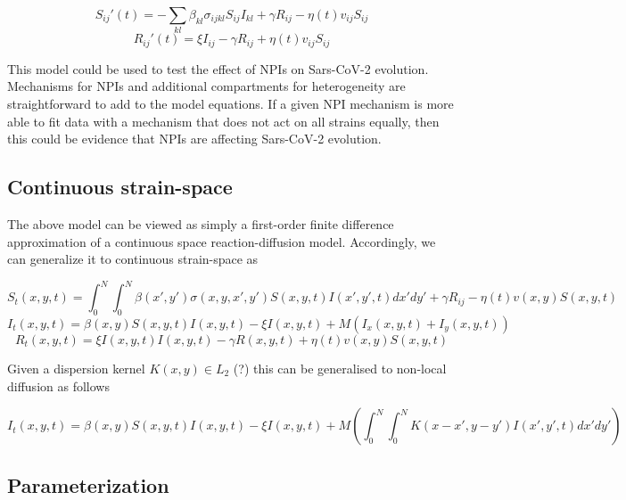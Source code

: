 \documentclass{article}
\begin{document}
\begin{equation}
    S_{ij}'(t) = -\sum_{kl} \beta_{kl} \sigma_{ijkl} S_{ij} I_{kl} + \gamma R_{ij} -  \eta(t) v_{ij} S_{ij} \label{Seqn}
\end{equation}
\begin{equation}
    R_{ij}'(t) = \xi I_{ij} - \gamma R_{ij} + \eta(t) v_{ij} S_{ij} \label{Reqn}
\end{equation}


This model could be used to test the effect of NPIs on Sars-CoV-2 evolution. Mechanisms for NPIs and additional compartments for heterogeneity are straightforward to add to the model equations. If a given NPI mechanism is more able to fit data with a mechanism that does not act on all strains equally, then this could be evidence that NPIs are affecting Sars-CoV-2 evolution. 

\subsection{Continuous strain-space}

The above model can be viewed as simply a first-order finite difference approximation of a continuous space reaction-diffusion model. Accordingly, we can generalize it to continuous strain-space as
 
\begin{equation}
    S_t(x,y,t) = \int_0^N \int_0^N \beta(x',y') \sigma(x,y,x', y') S(x,y,t) I(x',y',t) dx' dy' + \gamma R_{ij} -  \eta(t) v(x,y) S(x,y,t)\label{Seqn_cts}
\end{equation}
\begin{equation}
    I_t(x,y,t) = \beta(x,y) S(x,y,t) I(x,y,t)- \xi I(x,y,t) + M \left(I_x(x,y,t)  + I_y(x,y,t)  \right) \label{Ieqn_cts}    
\end{equation}
\begin{equation}
    R_t(x,y,t) = \xi I(x,y,t)I(x,y,t) - \gamma R(x,y,t) + \eta(t) v(x,y) S(x,y,t) \label{Reqn_cts}
\end{equation}

Given a dispersion kernel $K(x,y) \in L_2$ (?) this can be generalised to non-local diffusion as follows

\begin{equation}
    I_t(x,y,t) = \beta(x,y) S(x,y,t) I(x,y,t)- \xi I(x,y,t) + M \left(\int_0^N \int_0^N K(x-x',y-y')I(x',y',t) dx' dy'   \right) \label{Ieqn_cts_nonlocal}    
\end{equation}


\subsection{Parameterization}
\end{document}
